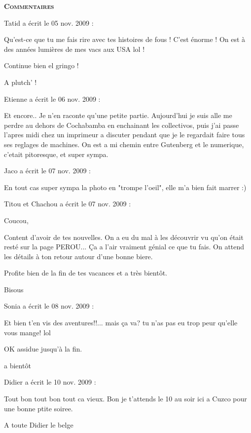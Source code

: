 \bigskip
\textbf{\textsc{Commentaires}}

 \medskip
Tatid a écrit le 05 nov. 2009 :
\begin{displayquote}
Qu'est-ce que tu me fais rire avec tes histoires de fous ! C'est énorme ! On est à des années lumières de mes vacs aux USA lol !

Continue bien el gringo !

A plutch' !
\end{displayquote}

 \medskip
Etienne a écrit le 06 nov. 2009 :
\begin{displayquote}
Et encore.. Je n'en raconte qu'une petite partie. Aujourd'hui je suis alle me perdre au dehors de Cochabamba en enchainant les collectivos, puis j'ai passe l'apres midi chez un imprimeur a discuter pendant que je le regardait faire tous ses reglages de machines. On est a mi chemin entre Gutenberg et le numerique, c'etait pitoresque, et super sympa.
\end{displayquote}

 \medskip
Jaco a écrit le 07 nov. 2009 :
\begin{displayquote}
En tout cas super sympa la photo en "trompe l'oeil", elle m'a bien fait marrer :)
\end{displayquote}

 \medskip
Titou et Chachou a écrit le 07 nov. 2009 :
\begin{displayquote}
Coucou,

Content d'avoir de tes nouvelles. On a eu du mal à les découvrir vu qu'on était resté sur la page PEROU... Ça a l'air vraiment génial ce que tu fais. On attend les détails à ton retour autour d'une bonne biere.

Profite bien de la fin de tes vacances et a très bientôt.

Bisous
\end{displayquote}

 \medskip
Sonia a écrit le 08 nov. 2009 :
\begin{displayquote}
Et bien t'en vis des aventures!!... mais ça va? tu n'as pas eu trop peur qu'elle vous mange! lol

OK assidue jusqu'à la fin.

a bientôt
\end{displayquote}

 \medskip
Didier a écrit le 10 nov. 2009 :
\begin{displayquote}
Tout bon tout bon tout ca vieux. Bon je t'attends le 10 au soir ici a Cuzco pour une bonne ptite soiree.

A toute
Didier le belge
\end{displayquote}

